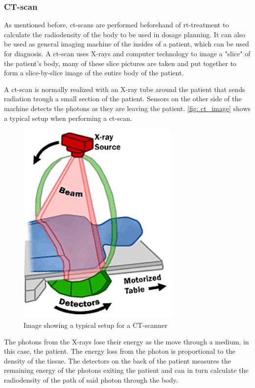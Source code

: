 \documentclass[main.tex]{subfiles}
\begin{document}
\subsubsection{CT-scan}
As mentioned before, \gls{ct}-scans are performed beforehand of \gls{rt}-treatment to calculate the radiodensity of the body to be used in dosage planning. It can also be used as general imaging machine of the insides of a patient, which can be used for diagnosis. A \gls{ct}-scan uses X-rays and computer technology to image a "slice" of the patient's body, many of these slice pictures are taken and put together to form a slice-by-slice image of the entire body of the patient.

A \gls{ct}-scan is normally realized with an X-ray tube around the patient that sends radiation trough a small section of the patient. Sensors on the other side of the machine detects the photons as they are leaving the patient. \autoref{fig: ct_image} shows a typical setup when performing a \gls{ct}-scan.

 \begin{figure}[!htpb]
    \centering
    \includegraphics[width=8cm ]{images/CTXRAYScan.png}
    \caption{Image showing a typical setup for a CT-scanner\cite{CTimage}}
    \label{fig: ct_image}
\end{figure}
\FloatBarrier 

The photons from the X-rays lose their energy as the move through a medium, in this case, the patient. The energy loss from the photon is proportional to the density of the tissue. The detectors on the back of the patient measures the remaining energy of the photons exiting the patient and can in turn calculate the radiodensity of the path of said photon through the body.
\end{document}
